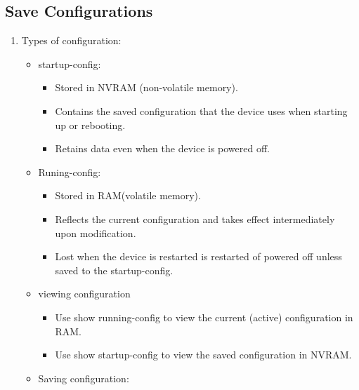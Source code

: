 \documentclass[a4paper,11pt]{article}
\begin{document}
\subsection{Save Configurations}
\begin{enumerate}
    \item Types of configuration:\\
    \begin{itemize}
        \item startup-config:\\
          \begin{itemize}
            \item Stored in NVRAM (non-volatile memory).\\
            \item Contains the saved configuration that the device uses when starting up or rebooting.\\
            \item Retains data even when the device is powered off.\\
         \end{itemize}
        \item Runing-config:\\
         \begin{itemize}
            \item Stored in RAM(volatile memory).\\
            \item Reflects the current configuration and takes effect intermediately upon modification.\\
            \item Lost when the device is restarted is restarted of powered off unless saved to the startup-config.\\
          \end{itemize}
         \item viewing configuration\\
          \begin{itemize}
             \item Use show running-config to view the current (active) configuration in RAM.\\
             \item Use show startup-config to view the saved configuration in NVRAM.\\
          \end{itemize}
         \item Saving configuration:\\

\end{itemize}
\end{enumerate}
\end{document}
